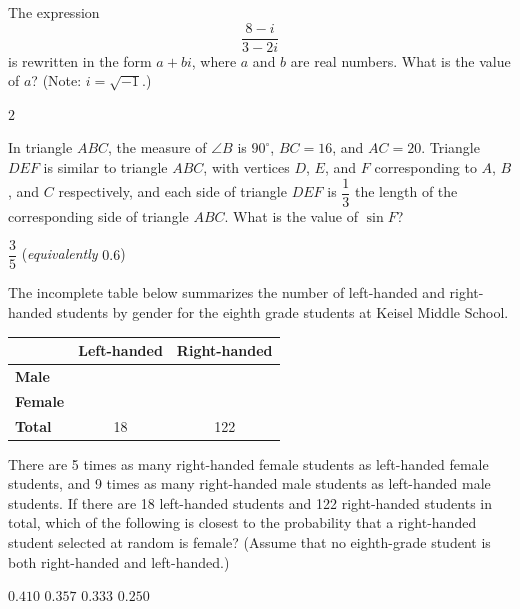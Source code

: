 \question[1]
The expression
\[
  \frac{8 - i}{3 - 2i}
\]
is rewritten in the form $a + bi$, where $a$ and $b$ are real numbers. What is the value of $a$? (Note: $i = \sqrt{-1}$.)
\begin{solution}
$2$
\end{solution}



\newpage



\question[1]
In triangle $ABC$, the measure of $\angle B$ is $90^\circ$, $BC = 16$, and $AC = 20$. 
Triangle $DEF$ is similar to triangle $ABC$, with vertices $D$, $E$, and $F$ corresponding 
to $A$, $B$, and $C$ respectively, and each side of triangle $DEF$ is $\dfrac{1}{3}$ the 
length of the corresponding side of triangle $ABC$. What is the value of $\sin F$?
\begin{solution}
$\dfrac{3}{5}$ \quad (\textit{equivalently} $0.6$)
\end{solution}


\question[1]
The incomplete table below summarizes the number of left-handed and right-handed students by gender for the eighth grade students at Keisel Middle School.
\begin{center}
  \renewcommand{\arraystretch}{1.3}
  \setlength{\tabcolsep}{0.6em}
  \begin{tabular}{|l|c|c|}
    \hline
    & \textbf{Left-handed} & \textbf{Right-handed} \\ \hline
    \textbf{Male}   & \hspace{1.2cm} & \hspace{1.2cm} \\ \hline
    \textbf{Female} & \hspace{1.2cm} & \hspace{1.2cm} \\ \hline
    \textbf{Total} & 18 & 122 \\ \hline
  \end{tabular}
\end{center}
There are 5 times as many right-handed female students as left-handed female students, and 9 times as many right-handed male students as left-handed male students. If there are 18 left-handed students and 122 right-handed students in total, which of the following is closest to the probability that a right-handed student selected at random is female? (Assume that no eighth-grade student is both right-handed and left-handed.)

\begin{choices}
  \CorrectChoice $0.410$
  \choice $0.357$
  \choice $0.333$
  \choice $0.250$
\end{choices}



